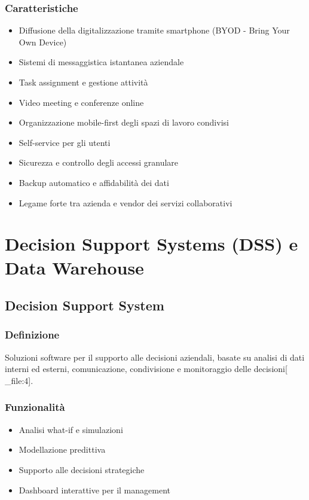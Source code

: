 \documentclass[12pt,a4paper]{article}
\begin{document}
\subsubsection{Caratteristiche}
\begin{itemize}
    \item Diffusione della digitalizzazione tramite smartphone (BYOD - Bring Your Own Device)
    \item Sistemi di messaggistica istantanea aziendale
    \item Task assignment e gestione attività
    \item Video meeting e conferenze online
    \item Organizzazione mobile-first degli spazi di lavoro condivisi
    \item Self-service per gli utenti
    \item Sicurezza e controllo degli accessi granulare
    \item Backup automatico e affidabilità dei dati
    \item Legame forte tra azienda e vendor dei servizi collaborativi
\end{itemize}

\section{Decision Support Systems (DSS) e Data Warehouse}

\subsection{Decision Support System}

\subsubsection{Definizione}
Soluzioni software per il supporto alle decisioni aziendali, basate su analisi di dati interni ed esterni, comunicazione, condivisione e monitoraggio delle decisioni[ _file:4].

\subsubsection{Funzionalità}
\begin{itemize}
    \item Analisi what-if e simulazioni
    \item Modellazione predittiva
    \item Supporto alle decisioni strategiche
    \item Dashboard interattive per il management
\end{itemize}
\end{document}
